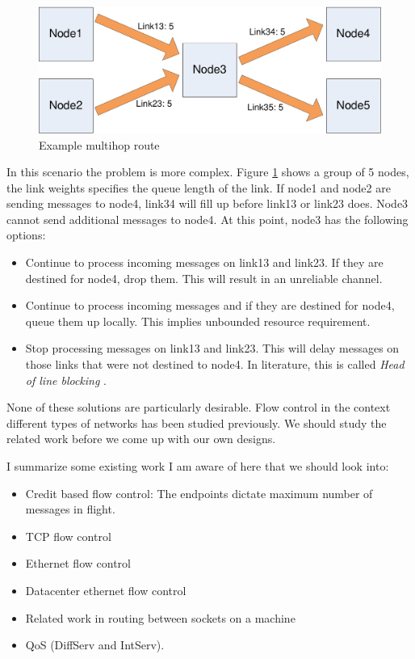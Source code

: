 \documentclass[a4paper,twoside]{report} %
\begin{document}
\begin{figure}[t]
 \includegraphics[width=\columnwidth]{many-to-many.pdf}
 \caption{Example multihop route}\label{fig:many-to-many}
\end{figure}

In this scenario the problem is more complex.
Figure \ref{fig:many-to-many} shows a group of 5 nodes,
the link weights specifies the queue length of the link.
If node1 and node2 are sending messages to node4,
link34 will fill up before link13 or link23 does.
Node3 cannot send additional messages to node4.
At this point, node3 has the following options:

\begin{itemize}
\item Continue to process incoming messages on link13 and link23.
  If they are destined for node4, drop them.
  This will result in an unreliable channel.
\item Continue to process incoming messages and if they are destined for node4,
  queue them up locally.
  This implies unbounded resource requirement.
\item Stop processing messages on link13 and link23.
  This will delay messages on those links that were not destined to node4.
  In literature, this is called \emph{Head of line blocking} \cite{cite}.
\end{itemize}

None of these solutions are particularly desirable.
Flow control in the context different types of networks has
been studied previously.
We should study the related work before we come up with our own designs.

I summarize some existing work I am aware of here that we should look into:
\begin{itemize}
\item Credit based flow control:
  The endpoints dictate maximum number of messages in flight.
\item TCP flow control
\item Ethernet flow control
\item Datacenter ethernet flow control
\item Related work in routing between sockets on a machine
\item QoS (DiffServ and IntServ).
\end{itemize}
\end{document}
